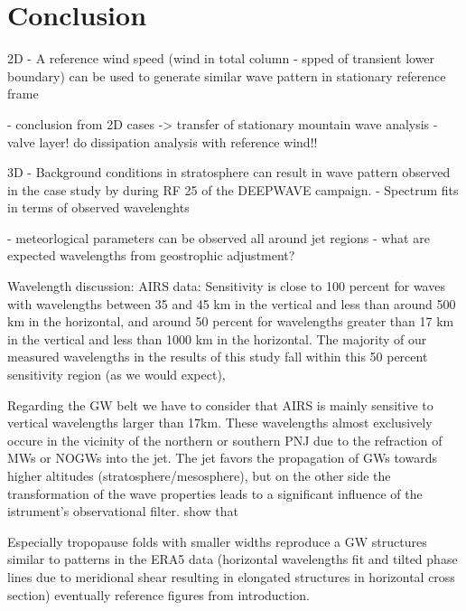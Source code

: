 \chapter{Conclusion}


2D
- A reference wind speed (wind in total column - spped of transient lower boundary) can be used to generate similar wave pattern in stationary reference frame

- conclusion from 2D cases -> transfer of stationary mountain wave analysis
- valve layer! do dissipation analysis with reference wind!!

3D
- Background conditions in stratosphere can result in wave pattern observed in the case study by \cite{dornbrack_stratospheric_2022} during RF 25 of the DEEPWAVE campaign.
- Spectrum fits in terms of observed wavelenghts

- meteorlogical parameters can be observed all around jet regions 
 - what are expected wavelengths from geostrophic adjustment?

Wavelength discussion:
AIRS data:
Sensitivity is close to 100 percent for waves with wavelengths between 35 and 45 km in the vertical and less than around 500 km in the horizontal, and around 50 percent for wavelengths greater than 17 km in the vertical and less than 1000 km in the horizontal. The majority of our measured wavelengths in the results of this study fall within this 50 percent sensitivity region (as we would expect),

Regarding the GW belt we have to consider that AIRS is mainly sensitive to vertical wavelengths larger than 17km. These wavelengths almost exclusively occure in the vicinity of the northern or southern PNJ due to the refraction of MWs or NOGWs into the jet. The jet favors the propagation of GWs towards higher altitudes (stratosphere/mesosphere), but on the other side the transformation of the wave properties leads to a significant influence of the istrument's observational filter.
\textcite[]{hindley_gravity_2019} show that 

Especially tropopause folds with smaller widths reproduce a GW structures similar to patterns in the ERA5 data (horizontal wavelengths fit and tilted phase lines due to meridional shear resulting in elongated structures in horizontal cross section) \textcite[]{dornbrack_stratospheric_2022}
eventually reference figures from introduction.


